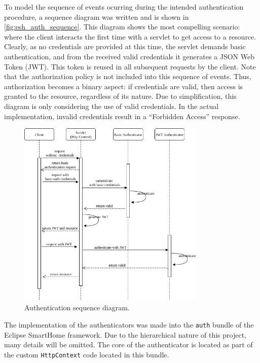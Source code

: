 \documentclass[12pt]{article}
\begin{document}
To model the sequence of events ocurring during the intended authentication procedure, a sequence diagram was written and is shown in \autoref{fig:esh_auth_sequence}. This diagram shows the most compelling scenario: where the client interacts the first time with a servlet to get access to a resource. Clearly, as no credentials are provided at this time, the servlet demands basic authentication, and from the received valid credentials it generates a JSON Web Token (JWT). This token is reused in all subsequent requests by the client. Note that the authorization policy is not included into this sequence of events. Thus, authorization becomes a binary aspect: if credentials are valid, then access is granted to the resource, regardless of its nature. Due to simplification, this diagram is only considering the use of valid credentials. In the actual implementation, invalid credentials result in a ``Forbidden Access'' response. 

\begin{figure} [ht] 
\begin{center}
\includegraphics[width=0.8\textwidth]{esh_auth_sequence}
\caption{Authentication sequence diagram.}
\label{fig:esh_auth_sequence}
\end{center}
\end{figure}

The implementation of the authenticators was made into the \texttt{auth} bundle of the Eclipse SmartHome framework. Due to the hierarchical nature of this project, many details will be omitted. The core of the authenticator is located as part of the custom \texttt{HttpContext} code located in this bundle.
\end{document}
